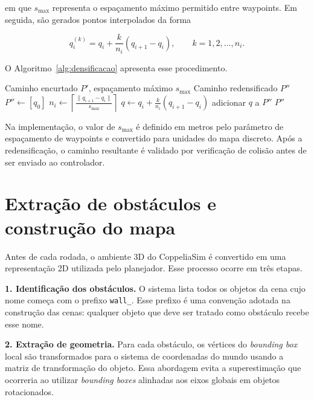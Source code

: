 em que $s_{\max}$ representa o espaçamento máximo permitido entre waypoints. Em seguida, são gerados pontos interpolados da forma

\begin{equation}
    q_i^{(k)} =
    q_i +
    \frac{k}{n_i}(q_{i+1} - q_i),
    \qquad k = 1,2,\ldots,n_i.
    \label{eq:densificacao_interpolacao}
\end{equation}

O Algoritmo~\ref{alg:densificacao} apresenta esse procedimento.

\begin{algorithm}[H]
\caption{Redensificação do caminho por interpolação linear}
\label{alg:densificacao}
\begin{algorithmic}[1]
\Require Caminho encurtado $P'$, espaçamento máximo $s_{\max}$
\Ensure Caminho redensificado $P''$
\State $P'' \gets [q_0]$
    \State $n_i \gets \left\lceil \frac{\|q_{i+1}-q_i\|}{s_{\max}} \right\rceil$
        \State $q \gets q_i + \frac{k}{n_i}(q_{i+1}-q_i)$
        \State adicionar $q$ a $P''$
    \EndFor
\EndFor
\State \Return $P''$
\end{algorithmic}
\end{algorithm}

Na implementação, o valor de $s_{\max}$ é definido em metros pelo parâmetro de espaçamento de waypoints e convertido para unidades do mapa discreto. Após a redensificação, o caminho resultante é validado por verificação de colisão antes de ser enviado ao controlador.

\section{Extração de obstáculos e construção do mapa}
\label{sec:extracao_obstaculos_mapa}

Antes de cada rodada, o ambiente 3D do CoppeliaSim é convertido em uma representação 2D utilizada pelo planejador. Esse processo ocorre em três etapas.

\textbf{1. Identificação dos obstáculos.} O sistema lista todos os objetos da cena cujo nome começa com o prefixo \texttt{wall\_}. Esse prefixo é uma convenção adotada na construção das cenas: qualquer objeto que deve ser tratado como obstáculo recebe esse nome.

\textbf{2. Extração de geometria.} Para cada obstáculo, os vértices do \emph{bounding box} local são transformados para o sistema de coordenadas do mundo usando a matriz de transformação do objeto. Essa abordagem evita a superestimação que ocorreria ao utilizar \emph{bounding boxes} alinhadas aos eixos globais em objetos rotacionados.

